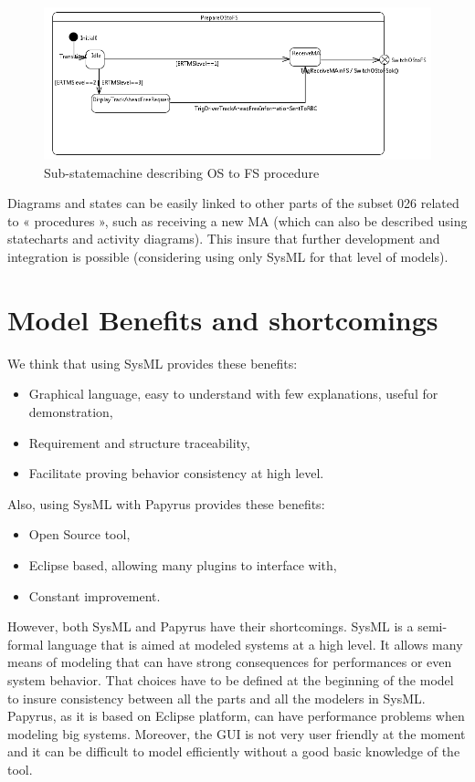 \documentclass{template/openetcs_article}
\begin{document}
\begin{figure}[h]
  \centering
  \includegraphics[width=14cm]{fig11_sub_statechart_OStoFS.png}
  \caption{Sub-statemachine describing OS to FS procedure}
  \label{fig: Sub-statemachine describing OS to FS procedure}
\end{figure}
Diagrams and states can be easily linked to other parts of the subset 026 related to « procedures », such as receiving a new MA (which can also be described using statecharts and activity diagrams). This insure that further development and integration is possible (considering using only SysML for that level of models).

\section{Model Benefits and shortcomings}

We think that using SysML provides these benefits:
\begin{itemize}
\item Graphical language, easy to understand with few explanations, useful for demonstration,
\item Requirement and structure traceability,
\item Facilitate proving behavior consistency at high level.
\end{itemize}
Also, using SysML with Papyrus provides these benefits:
\begin{itemize}
\item Open Source tool,
\item Eclipse based, allowing many plugins to interface with,
\item Constant improvement.
\end{itemize}
However, both SysML and Papyrus have their shortcomings.
SysML is a semi-formal language that is aimed at modeled systems at a high level. It allows many means of modeling that can have strong consequences for performances or even system behavior. That choices have to be defined at the beginning of the model to insure consistency between all the parts and all the modelers in SysML.
Papyrus, as it is based on Eclipse platform, can have performance problems when modeling big systems. Moreover, the GUI is not very user friendly at the moment and it can be difficult to model efficiently without a good basic knowledge of the tool.

\nocite{*}


\end{document}
